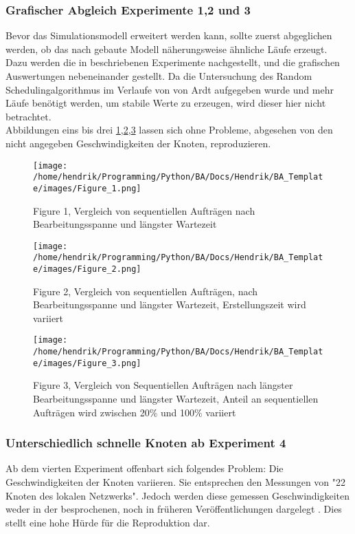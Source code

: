 \subsubsection{Grafischer Abgleich Experimente 1,2 und 3}
Bevor das Simulationsmodell erweitert werden kann, sollte zuerst abgeglichen werden, ob das nach gebaute Modell näherungsweise ähnliche Läufe erzeugt. Dazu werden die in \cite{Arn99} beschriebenen Experimente nachgestellt, und die grafischen Auswertungen nebeneinander gestellt.
Da die Untersuchung des Random Schedulingalgorithmus im Verlaufe von \cite{Arn99} von Ardt aufgegeben wurde und mehr Läufe benötigt werden, um stabile Werte zu erzeugen, wird dieser hier nicht betrachtet.\\
Abbildungen eins bis drei \ref{figure1},\ref{figure2},\ref{figure3} lassen sich ohne Probleme, abgesehen von den nicht angegeben Geschwindigkeiten der Knoten, reproduzieren.
\begin{figure}
\centering
\texttt{[image: /home/hendrik/Programming/Python/BA/Docs/Hendrik/BA\_Template/images/Figure\_1.png]}
\caption{Figure 1, Vergleich von sequentiellen Aufträgen nach Bearbeitungsspanne und längster Wartezeit}
\label{figure1}
\end{figure}
\begin{figure}
	\centering
	\texttt{[image: /home/hendrik/Programming/Python/BA/Docs/Hendrik/BA\_Template/images/Figure\_2.png]}
	\caption{Figure 2, Vergleich von sequentiellen Aufträgen, nach Bearbeitungsspanne und längster Wartezeit, Erstellungszeit wird variiert}
	\label{figure2}
\end{figure}
\begin{figure}
	\centering
	\texttt{[image: /home/hendrik/Programming/Python/BA/Docs/Hendrik/BA\_Template/images/Figure\_3.png]}
	\caption{Figure 3, Vergleich von Sequentiellen Aufträgen nach längster Bearbeitungsspanne und längster Wartezeit, Anteil an sequentiellen Aufträgen wird zwischen 20\% und 100\% variiert}
	\label{figure3}
\end{figure}

\FloatBarrier

\subsubsection{Unterschiedlich schnelle Knoten ab Experiment 4}
Ab dem vierten Experiment offenbart sich folgendes Problem: Die Geschwindigkeiten der Knoten variieren. Sie entsprechen den Messungen von "22 Knoten des lokalen Netzwerks". Jedoch werden diese gemessen Geschwindigkeiten weder in der besprochenen, noch in früheren Veröffentlichungen dargelegt \cite{norepr1,norepr2}. Dies stellt eine hohe Hürde für die Reproduktion dar.\\

